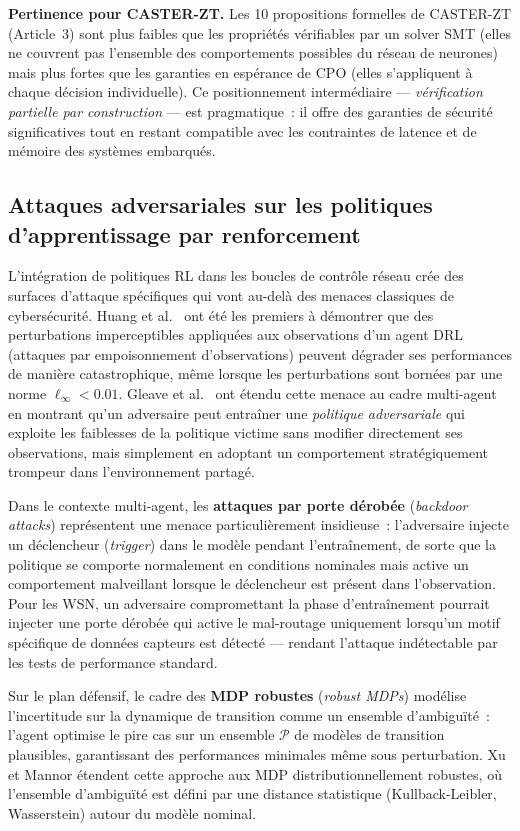 \textbf{Pertinence pour CASTER-ZT.} Les 10 propositions formelles de CASTER-ZT (Article~3) sont plus faibles que les propriétés vérifiables par un solver SMT (elles ne couvrent pas l'ensemble des comportements possibles du réseau de neurones) mais plus fortes que les garanties en espérance de CPO (elles s'appliquent à chaque décision individuelle). Ce positionnement intermédiaire --- \emph{vérification partielle par construction} --- est pragmatique~: il offre des garanties de sécurité significatives tout en restant compatible avec les contraintes de latence et de mémoire des systèmes embarqués.

\subsection{Attaques adversariales sur les politiques d'apprentissage par renforcement}

L'intégration de politiques RL dans les boucles de contrôle réseau crée des surfaces d'attaque spécifiques qui vont au-delà des menaces classiques de cybersécurité. Huang et al.\ \cite{Huang2017AdvRL} ont été les premiers à démontrer que des perturbations imperceptibles appliquées aux observations d'un agent DRL (attaques par empoisonnement d'observations) peuvent dégrader ses performances de manière catastrophique, même lorsque les perturbations sont bornées par une norme $\ell_\infty < 0.01$. Gleave et al.\ \cite{Gleave2020AdvPolicies} ont étendu cette menace au cadre multi-agent en montrant qu'un adversaire peut entraîner une \emph{politique adversariale} qui exploite les faiblesses de la politique victime sans modifier directement ses observations, mais simplement en adoptant un comportement stratégiquement trompeur dans l'environnement partagé.

Dans le contexte multi-agent, les \textbf{attaques par porte dérobée} (\emph{backdoor attacks}) \cite{Kiourti2021BackdoorDRL} représentent une menace particulièrement insidieuse~: l'adversaire injecte un déclencheur (\emph{trigger}) dans le modèle pendant l'entraînement, de sorte que la politique se comporte normalement en conditions nominales mais active un comportement malveillant lorsque le déclencheur est présent dans l'observation. Pour les WSN, un adversaire compromettant la phase d'entraînement pourrait injecter une porte dérobée qui active le mal-routage uniquement lorsqu'un motif spécifique de données capteurs est détecté --- rendant l'attaque indétectable par les tests de performance standard.

Sur le plan défensif, le cadre des \textbf{MDP robustes} (\emph{robust MDPs}) \cite{Iyengar2005RobustMDP} modélise l'incertitude sur la dynamique de transition comme un ensemble d'ambiguïté~: l'agent optimise le pire cas sur un ensemble $\mathcal{P}$ de modèles de transition plausibles, garantissant des performances minimales même sous perturbation. Xu et Mannor \cite{Xu2010DistRobustMDP} étendent cette approche aux MDP distributionnellement robustes, où l'ensemble d'ambiguïté est défini par une distance statistique (Kullback-Leibler, Wasserstein) autour du modèle nominal.

